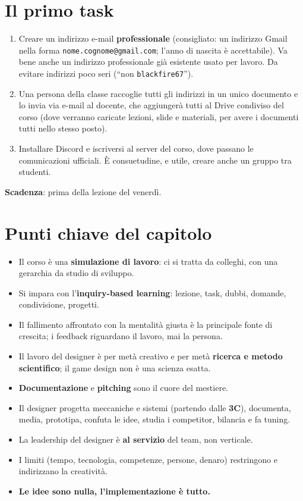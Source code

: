 \section{Il primo task}
\label{sec:primo-task}

\begin{enumerate}
  \item Creare un indirizzo e-mail \textbf{professionale} (consigliato: un indirizzo Gmail nella forma
        \texttt{nome.cognome@gmail.com}; l'anno di nascita è accettabile).
        Va bene anche un indirizzo professionale già esistente usato per
        lavoro. Da evitare indirizzi poco seri (``non \texttt{blackfire67}'').
  \item Una persona della classe raccoglie tutti gli indirizzi in un unico
        documento e lo invia via e-mail al docente, che aggiungerà tutti al
        Drive condiviso del corso (dove verranno caricate lezioni, slide e
        materiali, per avere i documenti tutti nello stesso posto).
  \item Installare Discord e iscriversi al server del corso, dove passano le
        comunicazioni ufficiali. È consuetudine, e utile, creare anche un
        gruppo tra studenti.
\end{enumerate}
\textbf{Scadenza}: prima della lezione del venerdì.

\section*{Punti chiave del capitolo}

\begin{itemize}
  \item Il corso è una \textbf{simulazione di lavoro}: ci si tratta da
        colleghi, con una gerarchia da studio di sviluppo.
  \item Si impara con l'\textbf{inquiry-based learning}: lezione, task,
        dubbi, domande, condivisione, progetti.
  \item Il fallimento affrontato con la mentalità giusta è la principale fonte
        di crescita; i feedback riguardano il lavoro, mai la persona.
  \item Il lavoro del designer è per metà creativo e per metà
        \textbf{ricerca e metodo scientifico}; il game design non è una
        scienza esatta.
  \item \textbf{Documentazione} e \textbf{pitching} sono il cuore del
        mestiere.
  \item Il designer progetta meccaniche e sistemi (partendo dalle
        \textbf{3C}), documenta, media, prototipa, confuta le idee, studia i
        competitor, bilancia e fa tuning.
  \item La leadership del designer è \textbf{al servizio} del team, non
        verticale.
  \item I limiti (tempo, tecnologia, competenze, persone, denaro) restringono
        e indirizzano la creatività.
  \item \textbf{Le idee sono nulla, l'implementazione è tutto.}
\end{itemize}
